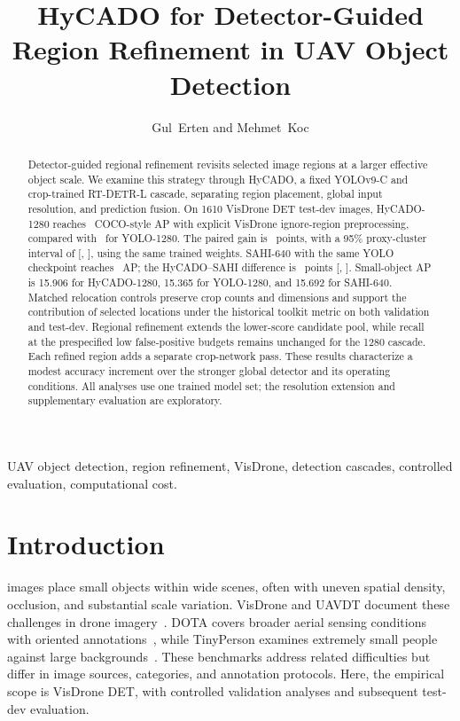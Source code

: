 \documentclass[journal]{IEEEtran}
\title{HyCADO for Detector-Guided Region Refinement in UAV Object Detection}
\author{Gul~Erten and Mehmet~Koc}
\begin{document}
\maketitle

\begin{abstract}
Detector-guided regional refinement revisits selected image regions at a larger effective object scale. We examine this strategy through HyCADO, a fixed YOLOv9-C and crop-trained RT-DETR-L cascade, separating region placement, global input resolution, and prediction fusion. On 1610 VisDrone DET test-dev images, HyCADO-1280 reaches \CocoH\ COCO-style AP with explicit VisDrone ignore-region preprocessing, compared with \CocoY\ for YOLO-1280. The paired gain is \CocoHY\ points, with a 95\% proxy-cluster interval of [\CocoHYLow, \CocoHYHigh], using the same trained weights. SAHI-640 with the same YOLO checkpoint reaches \CocoS\ AP; the HyCADO--SAHI difference is \CocoHS\ points [\CocoHSLow, \CocoHSHigh]. Small-object AP is 15.906 for HyCADO-1280, 15.365 for YOLO-1280, and 15.692 for SAHI-640. Matched relocation controls preserve crop counts and dimensions and support the contribution of selected locations under the historical toolkit metric on both validation and test-dev. Regional refinement extends the lower-score candidate pool, while recall at the prespecified low false-positive budgets remains unchanged for the 1280 cascade. Each refined region adds a separate crop-network pass. These results characterize a modest accuracy increment over the stronger global detector and its operating conditions. All analyses use one trained model set; the resolution extension and supplementary evaluation are exploratory.

\end{abstract}

\begin{IEEEkeywords}
UAV object detection, region refinement, VisDrone, detection cascades, controlled evaluation, computational cost.
\end{IEEEkeywords}

\section{Introduction}
 images place small objects within wide scenes, often with uneven spatial density, occlusion, and substantial scale variation. VisDrone and UAVDT document these challenges in drone imagery~\cite{du2019visdrone,du2018uavdt}. DOTA covers broader aerial sensing conditions with oriented annotations~\cite{xia2018dota}, while TinyPerson examines extremely small people against large backgrounds~\cite{yu2020tinyperson}. These benchmarks address related difficulties but differ in image sources, categories, and annotation protocols. Here, the empirical scope is VisDrone DET, with controlled validation analyses and subsequent test-dev evaluation.
\end{document}
